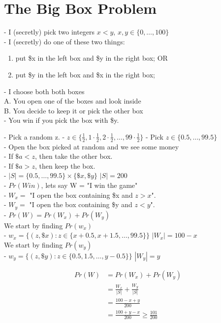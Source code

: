 \documentclass[a4paper,12pt]{article}
\begin{document}
\section{The Big Box Problem}
- I (secretly) pick two integers $x < y$, $x,y \in \{0,\ldots, 100\}$\\ 
- I (secretly) do one of these two things:\\
\begin{enumerate}
  \item put \$x in the left box and \$y in the right box; OR
  \item put \$y in the left box and \$x in the right box; 
\end{enumerate}
- I choose both both boxes\\
A. You open one of the boxes and look inside \\ 
B. You decide to keep it or pick the other box \\ 
- You win if you pick the box with \$y.

- Pick a random z.
- $z \in \{\frac{1}{2}, 1\cdot\frac{1}{2}, 2\cdot\frac{1}{2},\ldots,99\cdot\frac{1}{2}\}$
- Pick $z \in \{0.5, \ldots, 99.5\}$ \\ 
- Open the box picked at random and we see some money \\ 
- If $\$a < z$, then take the other box. \\
- If $\$a > z$, then keep the box. \\ 
- $|S| = \{0.5, \ldots, 99.5\} \times \{\$x, \$y\}$ $|S| = 200$\\
- $Pr(Win)$, lets say W = "I win the game" \\ 
- $W_{x} =$ "I open the box containing \$x and $z > x$". \\
- $W_{y} =$ "I open the box containing \$y and $z < y$". \\ 
- $Pr(W) = Pr(W_{x}) + Pr(W_{y})$ \\
We start by finding $Pr(w_{x})$ \\
- $w_{x} = \{(z, \$x): z \in \{x+0.5, x+1.5, \ldots, 99.5\}\}$ $|W_{x}| = 100 - x$\\
We start by finding $Pr(w_{y})$ \\
- $w_{y} = \{(z, \$y): z \in \{0.5, 1.5, \ldots, y-0.5\}\}$ $|W_{y}| = y$

\begin{align*}
  Pr(W) &= Pr(W_{x}) + Pr(W_{y})\\ 
  &= \frac{W_{x}}{|S|} + \frac{W_{y}}{|S|}\\
  &= \frac{100-x+y}{200}\\ 
  &= \frac{100+y-x}{200} \geq \frac{101}{200}
\end{align*}
\end{document}

